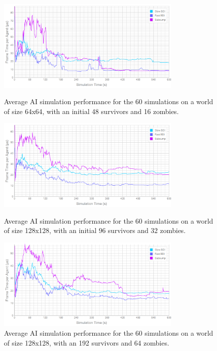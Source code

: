 \documentclass[12pt,a4paper]{article}
\begin{document}
\begin{figure}
\vspace{-20mm}
\centering
\includegraphics[width=0.8\textwidth]{../../Results/64_48_16/performance}
\caption{\small Average AI simulation performance for the 60 simulations on a world of size 64x64, with an initial 48 survivors and 16 zombies.}
\label{fig:64_48_16_per}

\vspace{5mm}
\includegraphics[width=0.8\textwidth]{../../Results/128_96_32/performance}
\caption{\small Average AI simulation performance for the 60 simulations on a world of size 128x128, with an initial 96 survivors and 32 zombies.}
\label{fig:64_96_32_per}

\vspace{5mm}
\includegraphics[width=0.8\textwidth]{../../Results/128_192_64/performance}
\caption{\small Average AI simulation performance for the 60 simulations on a world of size 128x128, with an 192 survivors and 64 zombies.}
\label{fig:128_192_64_per}
\end{figure}
\end{document}
